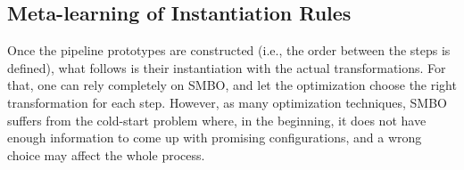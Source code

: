 \begin{figure}
	\begin{floatrow}
	\end{floatrow}
\end{figure}

\subsection{Meta-learning of Instantiation Rules}
\label{effective-ssec:meta-learning}

Once the pipeline prototypes are constructed (i.e., the order between the steps is defined), what follows is their instantiation with the actual transformations.
For that, one can rely completely on SMBO, and let the optimization choose the right transformation for each step.
However, as many optimization techniques, SMBO suffers from the cold-start problem where, in the beginning, it does not have enough information to come up with promising configurations, and a wrong choice may affect the whole process.

